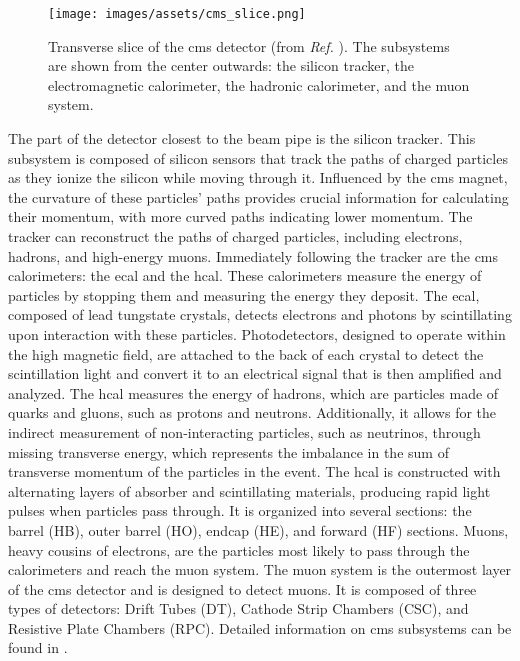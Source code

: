 \begin{figure}[h]
	\centering
	\texttt{[image: images/assets/cms\_slice.png]}
	\caption[Tranverse slice of CMS detector]{Transverse slice of the \acrshort{cms} detector (from \textit{Ref.} \cite{Barney:2120661}). The subsystems are shown from the center outwards: the silicon tracker, the electromagnetic calorimeter, the hadronic calorimeter, and the muon system.}
	\label{fig:cms_slice}
\end{figure}


The part of the detector closest to the beam pipe is the silicon tracker. This subsystem is composed of silicon sensors that track the paths of charged particles as they ionize the silicon while moving through it. Influenced by the \acrshort{cms} magnet, the curvature of these particles' paths provides crucial information for calculating their momentum, with more curved paths indicating lower momentum. The tracker can reconstruct the paths of charged particles, including electrons, hadrons, and high-energy muons. Immediately following the tracker are the \acrshort{cms} calorimeters: the \acrfull{ecal} and the \acrfull{hcal}. These calorimeters measure the energy of particles by stopping them and measuring the energy they deposit. The \acrshort{ecal}, composed of lead tungstate crystals, detects electrons and photons by scintillating upon interaction with these particles. Photodetectors, designed to operate within the high magnetic field, are attached to the back of each crystal to detect the scintillation light and convert it to an electrical signal that is then amplified and analyzed. The \acrshort{hcal} measures the energy of hadrons, which are particles made of quarks and gluons, such as protons and neutrons. Additionally, it allows for the indirect measurement of non-interacting particles, such as neutrinos, through missing transverse energy, which represents the imbalance in the sum of transverse momentum of the particles in the event. The \acrshort{hcal} is constructed with alternating layers of absorber and scintillating materials, producing rapid light pulses when particles pass through. It is organized into several sections: the barrel (HB), outer barrel (HO), endcap (HE), and forward (HF) sections. Muons, heavy cousins of electrons, are the particles most likely to pass through the calorimeters and reach the muon system. The muon system is the outermost layer of the \acrshort{cms} detector and is designed to detect muons. It is composed of three types of detectors: Drift Tubes (DT), Cathode Strip Chambers (CSC), and Resistive Plate Chambers (RPC). Detailed information on \acrshort{cms} subsystems can be found in \cite{CERN-LHCC-2020-004}.

